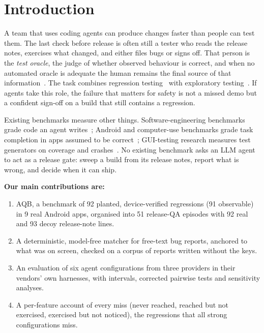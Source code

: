 \documentclass[10pt,letterpaper]{article}
\newcommand{\aqb}{AQB\xspace}
\begin{document}
\section{Introduction}
A team that uses coding agents can produce changes faster than people can test them. The last check
before release is often still a tester who reads the release notes, exercises what changed, and
either files bugs or signs off. That person is the \emph{test oracle}, the judge of whether observed
behaviour is correct, and when no automated oracle is adequate the human remains the final source of
that information~\cite{barr2015oracle}. The task combines regression testing~\cite{yoo2012regression}
with exploratory testing~\cite{itkonen2005exploratory}. If agents take this role, the failure that
matters for safety is not a missed demo but a confident sign-off on a build that still contains a
regression.

Existing benchmarks measure other things. Software-engineering benchmarks grade code an agent
writes~\cite{jimenez2024swebench,merrill2026terminalbench}; Android and computer-use benchmarks grade
task completion in apps assumed to be correct~\cite{rawles2025androidworld,xu2025androidlab,xie2024osworld};
GUI-testing research measures test generators on coverage and crashes~\cite{li2017droidbot,mao2016sapienz,su2017stoat,su2021themis}.
No existing benchmark asks an LLM agent to act as a release gate: sweep a build from its
release notes, report what is wrong, and decide when it can ship.

\textbf{Our main contributions are:}
\begin{enumerate}
\item \aqb, a benchmark of 92 planted, device-verified regressions (91 observable) in 9 real Android
  apps, organised into 51 release-QA episodes with 92 real and 93 decoy release-note lines.
\item A deterministic, model-free matcher for free-text bug reports, anchored to what was on screen,
  checked on a corpus of reports written without the keys.
\item An evaluation of six agent configurations from three providers in their vendors' own harnesses,
  with intervals, corrected pairwise tests and sensitivity analyses.
\item A per-feature account of every miss (never reached, reached but not exercised, exercised but not
  noticed), the regressions that all strong configurations miss.
\end{enumerate}
\end{document}
